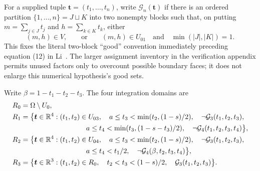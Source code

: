 For a supplied tuple $\boldsymbol t=(t_1,\ldots,t_n)$, write
$\mathcal{G}_n(\boldsymbol t)$ if there is an ordered partition
$\{1,\ldots,n\}=J\sqcup K$ into two nonempty blocks such that,
on putting $m=\sum_{j\in J}t_j$ and $h=\sum_{k\in K}t_k$, either
\[
 (m,h)\in V,
 \qquad\text{or}\qquad
 (m,h)\in U_{01}\quad\text{and}\quad
                       \min(|J|,|K|)=1.
\]
This fixes the literal two-block ``good'' convention immediately
preceding equation (12) in Li~\cite{LiIII}. The larger assignment
inventory in the verification appendix permits unused factors only
to overcount possible boundary faces; it does not enlarge this
numerical hypothesis's good sets.

Write $\beta=1-t_1-t_2-t_3$. The four integration domains are
\begin{align*}
 R_0={}&\Omega\setminus U_0,\\
 R_1={}&\bigl\{\boldsymbol t\in\mathbb R^4:
  (t_1,t_2)\in U_{03},\quad
  a\le t_3<\min(t_2,(1-s)/2),\quad \neg \mathcal{G}_3(t_1,t_2,t_3),\\
 &\hspace{28mm}a\le t_4<\min(t_3,(1-s-t_3)/2),\quad
                          \neg \mathcal{G}_4(t_1,t_2,t_3,t_4)\bigr\},\\
 R_2={}&\bigl\{\boldsymbol t\in\mathbb R^4:
  (t_1,t_2)\in U_{04},\quad
  a\le t_3<\min(t_2,(1-s)/2),\quad \neg \mathcal{G}_3(t_1,t_2,t_3),\\
 &\hspace{28mm}a\le t_4<t_1/2,\quad
                                \neg \mathcal{G}_4(\beta,t_2,t_3,t_4)\bigr\},\\
 R_3={}&\bigl\{\boldsymbol t\in\mathbb R^3:
  (t_1,t_2)\in R_0,\quad
  t_2<t_3<(1-s)/2,\quad \mathcal{G}_3(t_1,t_2,t_3)\bigr\}.
\end{align*}

